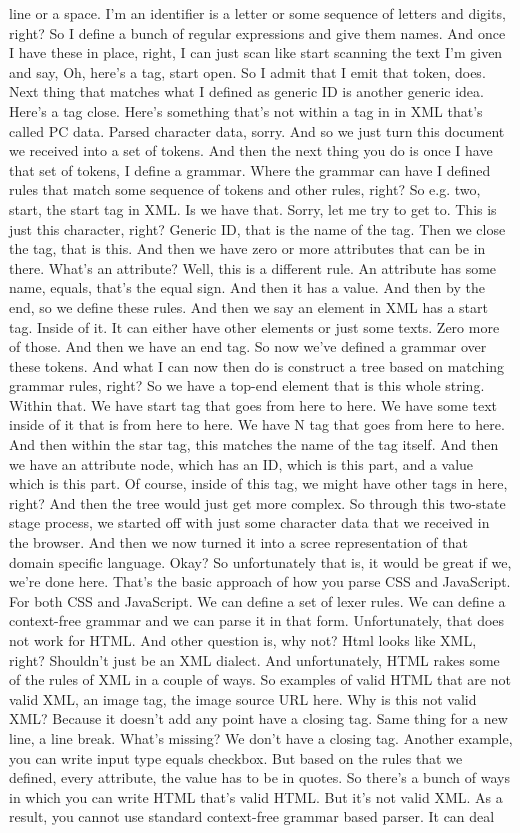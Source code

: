 line or a space. I'm an identifier is a letter or some sequence of letters and digits, right? So I define a bunch of regular expressions and give them names. And once I have these in place, right, I can just scan like start scanning the text I'm given and say, Oh, here's a tag, start open. So I admit that I emit that token, does. Next thing that matches what I defined as generic ID is another generic idea. Here's a tag close. Here's something that's not within a tag in in XML that's called PC data. Parsed character data, sorry. And so we just turn this document we received into a set of tokens. And then the next thing you do is once I have that set of tokens, I define a grammar. Where the grammar can have I defined rules that match some sequence of tokens and other rules, right? So e.g. two, start, the start tag in XML. Is we have that. Sorry, let me try to get to. This is just this character, right? Generic ID, that is the name of the tag. Then we close the tag, that is this. And then we have zero or more attributes that can be in there. What's an attribute? Well, this is a different rule. An attribute has some name, equals, that's the equal sign. And then it has a value. And then by the end, so we define these rules. And then we say an element in XML has a start tag. Inside of it. It can either have other elements or just some texts. Zero more of those. And then we have an end tag. So now we've defined a grammar over these tokens. And what I can now then do is construct a tree based on matching grammar rules, right? So we have a top-end element that is this whole string. Within that. We have start tag that goes from here to here. We have some text inside of it that is from here to here. We have N tag that goes from here to here. And then within the star tag, this matches the name of the tag itself. And then we have an attribute node, which has an ID, which is this part, and a value which is this part. Of course, inside of this tag, we might have other tags in here, right? And then the tree would just get more complex. So through this two-state stage process, we started off with just some character data that we received in the browser. And then we now turned it into a scree representation of that domain specific language. Okay? So unfortunately that is, it would be great if we, we're done here. That's the basic approach of how you parse CSS and JavaScript. For both CSS and JavaScript. We can define a set of lexer rules. We can define a context-free grammar and we can parse it in that form. Unfortunately, that does not work for HTML. And other question is, why not? Html looks like XML, right? Shouldn't just be an XML dialect. And unfortunately, HTML rakes some of the rules of XML in a couple of ways. So examples of valid HTML that are not valid XML, an image tag, the image source URL here. Why is this not valid XML? Because it doesn't add any point have a closing tag. Same thing for a new line, a line break. What's missing? We don't have a closing tag. Another example, you can write input type equals checkbox. But based on the rules that we defined, every attribute, the value has to be in quotes. So there's a bunch of ways in which you can write HTML that's valid HTML. But it's not valid XML. As a result, you cannot use standard context-free grammar based parser. It can deal 